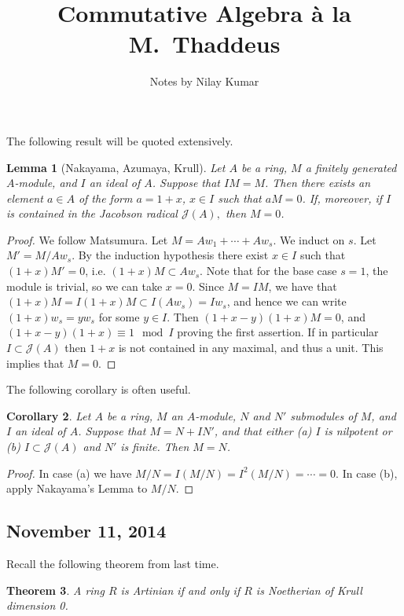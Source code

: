 \documentclass{article}
\title{Commutative Algebra \`a la M.~Thaddeus}
\author{Notes by Nilay Kumar}
\date{}
\theoremstyle{plain}
\newtheorem{thm}{Theorem}
\newtheorem{lem}[thm]{Lemma}
\newtheorem{cor}[thm]{Corollary}
\theoremstyle{definition}
\theoremstyle{remark}
\begin{document}
\maketitle

The following result will be quoted extensively.

\begin{lem}[Nakayama, Azumaya, Krull]
     Let $A$ be a ring, $M$ a finitely generated $A$-module, and $I$ an ideal of $A$.
     Suppose that $IM=M$. Then there exists an element $a\in A$ of the form $a=1+x$,
     $x\in I$ such that $aM=0$. If, moreover, if $I$ is contained in the Jacobson radical
     $\mathcal{J}(A),$ then $M=0$.
\end{lem}
\begin{proof}
    We follow Matsumura.
    Let $M=Aw_1+\cdots+Aw_s$. We induct on $s$. Let $M'=M/Aw_s$. By the induction
    hypothesis there exist $x\in I$ such that $(1+x)M'=0$, i.e. $(1+x)M\subset Aw_s$.
    Note that for the base case $s=1$, the module is trivial, so we can take $x=0$.
    Since $M=IM$, we have that
    $(1+x)M=I(1+x)M\subset I(Aw_s)=Iw_s$, and hence we can write $(1+x)w_s=yw_s$ for some
    $y\in I$. Then $(1+x-y)(1+x)M=0$, and $(1+x-y)(1+x)\equiv 1\mod I$ proving the
    first assertion. If in particular $I\subset\mathcal{J}(A)$ then $1+x$ is not contained
    in any maximal, and thus a unit. This implies that $M=0$.
\end{proof}

The following corollary is often useful.
\begin{cor}
    Let $A$ be a ring, $M$ an $A$-module, $N$ and $N'$ submodules of $M$, and $I$ an
    ideal of $A$. Suppose that $M=N+IN'$, and that either (a) $I$ is nilpotent or (b)
    $I\subset\mathcal{J}(A)$ and $N'$ is finite. Then $M=N$.
\end{cor}
\begin{proof}
    In case (a) we have $M/N=I(M/N)=I^2(M/N)=\cdots=0.$ In case (b), apply Nakayama's
    Lemma to $M/N$.
\end{proof}

\subsection*{November 11, 2014}

Recall the following theorem from last time.
\begin{thm}
    A ring $R$ is Artinian if and only if $R$ is Noetherian of Krull dimension 0.
\end{thm}
\end{document}
